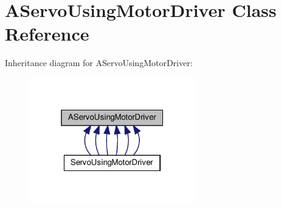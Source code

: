 \hypertarget{classAServoUsingMotorDriver}{}\section{A\+Servo\+Using\+Motor\+Driver Class Reference}
\label{classAServoUsingMotorDriver}


Inheritance diagram for A\+Servo\+Using\+Motor\+Driver\+:
\nopagebreak
\begin{figure}[H]
\begin{center}
\leavevmode
\includegraphics[width=205pt]{classAServoUsingMotorDriver__inherit__graph}
\end{center}
\end{figure}
